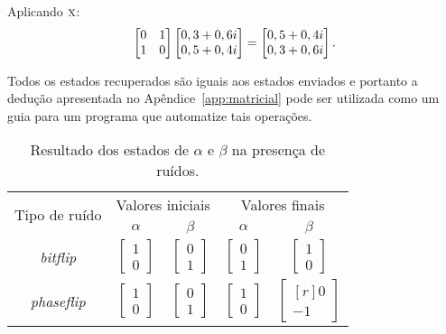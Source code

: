 \begin{enumerate}
        Aplicando \(\operatorname{\textsc{x}}\):
        \[
        \begin{bmatrix} 0 & 1 \\ 1 & 0 \end{bmatrix} \begin{bmatrix} {0,3+0,6i} \\ {0,5+0,4i} \end{bmatrix} = \begin{bmatrix} {0,5+0,4i} \\ {0,3+0,6i} \end{bmatrix}.
        \]
\end{enumerate}

Todos os estados recuperados são iguais aos estados enviados e portanto a dedução apresentada no Apêndice~\ref{app:matricial} pode ser utilizada como um guia para um programa que automatize tais operações.
\begin{table}[ht]
  \centering
  \caption{Resultado dos estados de $\alpha$ e $\beta$ na presença de ruídos.}\label{tab:resultadoruidos}
  \begin{tabular}{ccccc}
    \toprule
    \multirow{2}{*}{Tipo de ruído} & \multicolumn{2}{c}{Valores iniciais} & \multicolumn{2}{c}{Valores finais}                                     \\
    \cmidrule{2-5}
                                   & $\alpha$ & $\beta$ & $\alpha$ & $\beta$ \\
    \midrule
    \textit{bitflip}   & $\begin{bmatrix} 1 \\ 0 \end{bmatrix}$ & $\begin{bmatrix} 0 \\ 1 \end{bmatrix}$ & $\begin{bmatrix} 0 \\ 1 \end{bmatrix}$ & $\begin{bmatrix} 1 \\ 0 \end{bmatrix}$ \\
    \textit{phaseflip} & $\begin{bmatrix} 1 \\ 0 \end{bmatrix}$ & $\begin{bmatrix} 0 \\ 1 \end{bmatrix}$ & $\begin{bmatrix} 1 \\ 0 \end{bmatrix}$ & $\begin{bmatrix*}[r] 0 \\ -1 \end{bmatrix*}$ \\
    \bottomrule
  \end{tabular}
\end{table}
